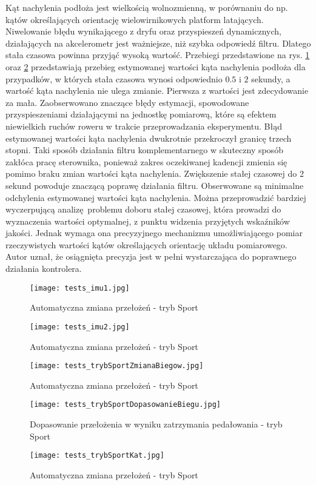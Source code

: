 Kąt nachylenia podłoża jest wielkością wolnozmienną, w porównaniu do np. kątów określających orientację wielowirnikowych platform latających. Niwelowanie błędu wynikającego z dryfu oraz przyspieszeń dynamicznych, działających na akcelerometr jest ważniejsze, niż szybka odpowiedź filtru. Dlatego stała czasowa powinna przyjąć wysoką wartość. Przebiegi przedstawione na rys. \ref{fig:tests_imu1} oraz \ref{fig:tests_imu2} przedstawiają przebieg estymowanej wartości kąta nachylenia podłoża dla przypadków, w których stała czasowa wynosi odpowiednio $0.5$ i $2$ sekundy, a wartość kąta nachylenia nie ulega zmianie. 
Pierwsza z wartości jest zdecydowanie za mała. Zaobserwowano znaczące błędy estymacji, spowodowane  przyspieszeniami działającymi na jednostkę pomiarową, które są efektem niewielkich ruchów roweru w trakcie przeprowadzania eksperymentu. Błąd estymowanej wartości kąta nachylenia dwukrotnie przekroczył granicę trzech stopni. Taki sposób działania filtru komplementarnego w skuteczny sposób zakłóca pracę sterownika, ponieważ zakres oczekiwanej kadencji zmienia się pomimo braku zmian wartości kąta nachylenia. Zwiększenie stałej czasowej do 2 sekund powoduje znaczącą poprawę działania filtru. Obserwowane są minimalne odchylenia estymowanej wartości kąta nachylenia. Można przeprowadzić bardziej wyczerpującą analizę problemu doboru stałej czasowej, która prowadzi do wyznaczenia wartości optymalnej, z punktu widzenia przyjętych wskaźników jakości. Jednak wymaga ona precyzyjnego mechanizmu umożliwiającego pomiar rzeczywistych wartości kątów określających orientację układu pomiarowego. Autor uznał, że osiągnięta precyzja jest w pełni wystarczająca do poprawnego działania kontrolera.

\begin{figure}[h]
    \centering
    \texttt{[image: tests\_imu1.jpg]}
    \caption{Automatyczna zmiana przełożeń - tryb Sport}
    \label{fig:tests_imu1}
\end{figure}

\begin{figure}[h]
    \centering
    \texttt{[image: tests\_imu2.jpg]}
    \caption{Automatyczna zmiana przełożeń - tryb Sport}
    \label{fig:tests_imu2}
\end{figure}
\begin{figure}[h]
    \centering
    \texttt{[image: tests\_trybSportZmianaBiegow.jpg]}
    \caption{Automatyczna zmiana przełożeń - tryb Sport}
    \label{fig:tests_sportMode}
\end{figure}

\begin{figure}[h]
    \centering
    \texttt{[image: tests\_trybSportDopasowanieBiegu.jpg]}
    \caption{Dopasowanie przełożenia w wyniku zatrzymania pedałowania - tryb Sport}
    \label{fig:tests_gearSpeedSelection}
\end{figure}




\begin{figure}[h]
    \centering
    \texttt{[image: tests\_trybSportKat.jpg]}
    \caption{Automatyczna zmiana przełożeń - tryb Sport}
    \label{fig:tests_sportMode}
\end{figure}

